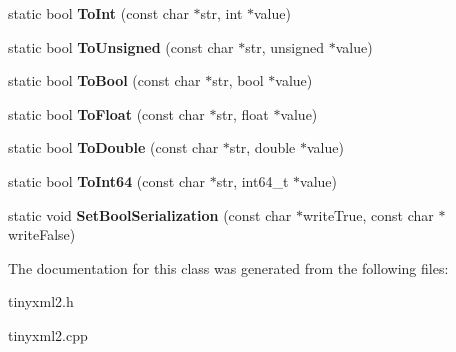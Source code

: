 \begin{DoxyCompactItemize}
\mbox{\label{classtinyxml2_1_1_x_m_l_util_ad4df4023d11ee3fca9689c49b9707323}} 
static bool {\bfseries To\+Int} (const char $\ast$str, int $\ast$value)
\item 
\mbox{\label{classtinyxml2_1_1_x_m_l_util_a210c8637d5eb4ce3d4625294af0efc2f}} 
static bool {\bfseries To\+Unsigned} (const char $\ast$str, unsigned $\ast$value)
\item 
\mbox{\label{classtinyxml2_1_1_x_m_l_util_ae5b03e0a1ca5d42052a7ac540f7aa12a}} 
static bool {\bfseries To\+Bool} (const char $\ast$str, bool $\ast$value)
\item 
\mbox{\label{classtinyxml2_1_1_x_m_l_util_a399e71edb5f29d61ea81d91ee0332bb9}} 
static bool {\bfseries To\+Float} (const char $\ast$str, float $\ast$value)
\item 
\mbox{\label{classtinyxml2_1_1_x_m_l_util_ad8f75ac140fb19c1c6e164a957c4cd53}} 
static bool {\bfseries To\+Double} (const char $\ast$str, double $\ast$value)
\item 
\mbox{\label{classtinyxml2_1_1_x_m_l_util_afe2ea09257431cd2b4b6d440552e4195}} 
static bool {\bfseries To\+Int64} (const char $\ast$str, int64\+\_\+t $\ast$value)
\item 
\mbox{\label{classtinyxml2_1_1_x_m_l_util_af98a6a80dbeec4679366c1aba4c5b747}} 
static void {\bfseries Set\+Bool\+Serialization} (const char $\ast$write\+True, const char $\ast$write\+False)
\end{DoxyCompactItemize}


The documentation for this class was generated from the following files\+:\begin{DoxyCompactItemize}
\item 
tinyxml2.\+h\item 
tinyxml2.\+cpp\end{DoxyCompactItemize}
